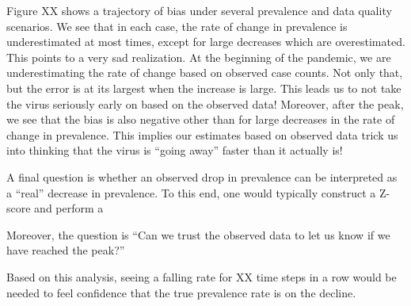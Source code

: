 \documentclass[11pt]{article}
\numberwithin{equation}{section}
\theoremstyle{plain}
\begin{document}
Figure XX shows a trajectory of bias under several prevalence and data quality scenarios.  We see that in each case, the rate of change in prevalence is underestimated at most times, except for large decreases which are overestimated.  This points to a very sad realization.  At the beginning of the pandemic, we are underestimating the rate of change based on observed case counts.  Not only that, but the error is at its largest when the increase is large. This leads us to not take the virus seriously early on based on the observed data! Moreover, after the peak, we see that the bias is also negative other than for large decreases in the rate of change in prevalence.  This implies our estimates based on observed data trick us into thinking that the virus is ``going away'' faster than it actually is!

A final question is whether an observed drop in prevalence can be interpreted as a ``real'' decrease in prevalence.  To this end, one would typically construct a Z-score and perform a

Moreover, the question is ``Can we trust the observed data to let us know if we have reached the peak?''

Based on this analysis, seeing a falling rate for XX time steps in a row would be needed to feel confidence that the true prevalence rate is on the decline.
\end{document}
